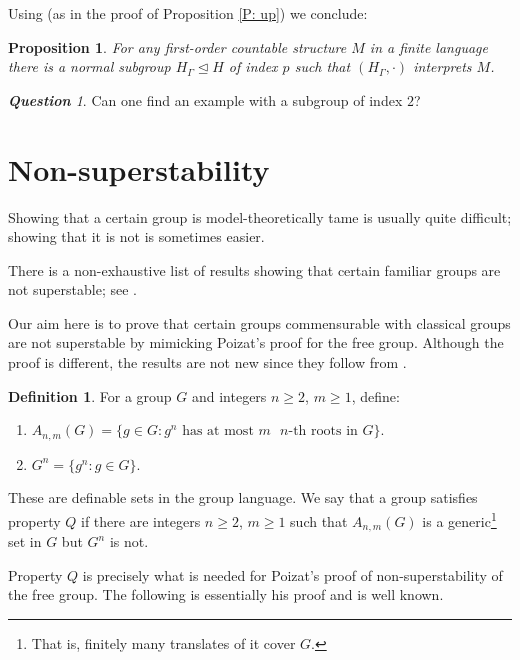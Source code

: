 \documentclass[11pt]{amsart}
\theoremstyle{plain}
\newtheorem{proposition}[theorem]{Proposition}
\theoremstyle{definition}
\newtheorem{definition}[theorem]{Definition}
\theoremstyle{remark}
\newtheorem{question}[theorem]{\textbf{Question}}
\numberwithin{equation}{section}
\begin{document}
Using \cite[Theorem 5.5.1]{Hodges} (as in the proof of Proposition \ref{P: up}) we conclude:

\begin{proposition}\label{P: down}
   For any first-order countable structure $M$ in a finite language there is a normal subgroup $H_\Gamma\trianglelefteq H$  of index $p$ such that $(H_\Gamma,\cdot)$ interprets $M$.
\end{proposition}


\begin{question}
    Can one find an example with a subgroup of index $2$?    
\end{question}

\appendix
\section{Non-superstability}
Showing that a certain group is model-theoretically tame is usually quite difficult; showing that it is not is sometimes easier. 

There is a non-exhaustive list of results showing that certain familiar groups are not superstable; see \cite{Poi:FreeNSuperstable, MuGiSh,superstablereisdual, CaPaPa}.

Our aim here is to prove that certain groups commensurable with classical groups are not superstable by mimicking Poizat's proof for the free group. Although the proof is different, the results are not new since they follow from \cite{superstablereisdual}.

\begin{definition}\label{D: property Q}
    For a group $G$ and integers $n\geq 2$, $m\geq 1$, define:
    \begin{enumerate}
        \item $A_{n,m}(G)=\{g\in G: \text{$g^n$ has at most $m$ $n$-th roots in $G$}\}$.
        \item $G^n=\{g^n: g \in G\}$.
    \end{enumerate}
    These are definable sets in the group language. We say that a group satisfies property $Q$ if there are integers $n\geq 2$, $m\geq 1$ such that $A_{n,m}(G)$ is a generic\footnote{That is, finitely many translates of it cover $G$.} set in $G$ but $G^n$ is not.
\end{definition}





Property $Q$ is precisely what is needed for Poizat's proof of non-superstability of the free group. The following is essentially his proof and is well known.
\end{document}
